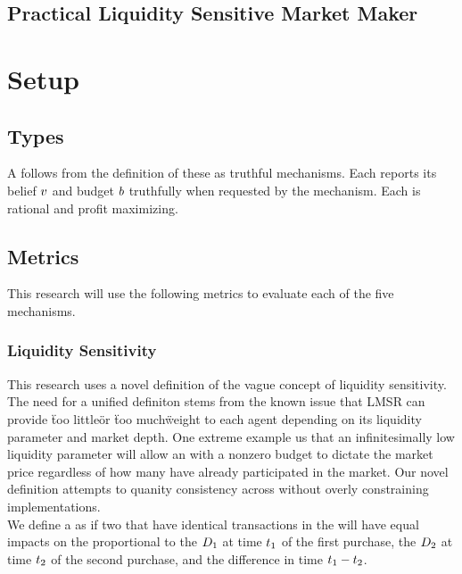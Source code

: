 \subsection{Practical Liquidity Sensitive Market Maker}

\section{Setup}

\subsection{Types}
A  follows from the definition of these  as truthful
mechanisms. Each  reports its belief $v$ and budget $b$
truthfully when requested by the mechanism. Each  is rational and profit
maximizing.

\subsection{Metrics}
This research will use the following metrics to evaluate each of the five mechanisms.
\subsubsection{Liquidity Sensitivity}
This research uses a novel definition of the vague concept of liquidity sensitivity. The need
for a unified definiton stems from the known issue that LMSR can provide \"too little\" or 
\"too much\" weight to each agent depending on its liquidity parameter and market depth. One extreme
example us that an infinitesimally low liquidity parameter will allow an  with a nonzero
budget to dictate the market price regardless of how many  have already participated in
the market. Our novel definition attempts to quanity consistency across  without
overly constraining implementations. \\

We define a  as  if two  that have identical
transactions in the  will have equal impacts on the  proportional to 
the  $D_{1}$ at time $t_{1}$ of the first purchase, the  
$D_{2}$ at time $t_{2}$ of the second purchase, and the difference in time $t_{1} - t_{2}$.\\

